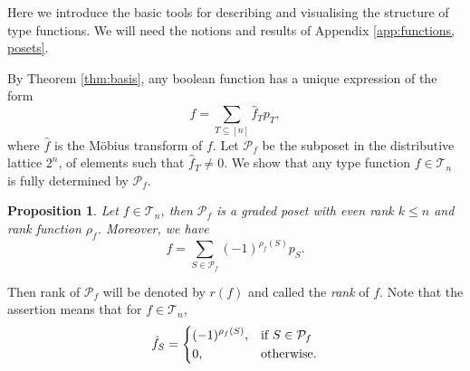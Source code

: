 \documentclass[12pt]{article}
\newtheorem{prop}{Proposition}
\theoremstyle{definition}
\theoremstyle{remark}
\def\Te{\mathcal T}
\def\Pe{\mathcal P}
\begin{document}
Here we introduce the basic tools for describing and visualising the structure of type
functions. We will need the notions and results of Appendix \ref{app:functions, posets}.


By Theorem \ref{thm:basis}, any boolean function has a unique expression of the form
\[
f=\sum_{T\subseteq [n]} \hat f_Tp_T,
\]
where $\hat f$ is the M\"obius transform of $f$. Let $\mathcal P_f$ be the subposet in the
distributive lattice $2^n$,  of elements such that
$\hat f_T\ne 0$. We show that any type function $f\in \Te_n$ is fully determined by $\Pe_f$.  




\begin{prop}\label{prop:graded} Let $f\in \Te_n$, then $\mathcal P_f$ is a graded poset
with even rank $k\le n$ and rank function $\rho_f$. Moreover, we have
\[
f=\sum_{S\in \mathcal P_f}(-1)^{\rho_f(S)}p_S.
\]


\end{prop}

Then rank of $\Pe_f$ will be denoted by $r(f)$ and called the {\em rank} of $f$. Note that the
assertion means that for $f\in \Te_n$, 
\[
\hat f_S=\begin{dcases} (-1)^{\rho_f(S)},& \text{if } S\in \Pe_f\\
0, & \text{otherwise}.
\end{dcases}
\]
\end{document}
